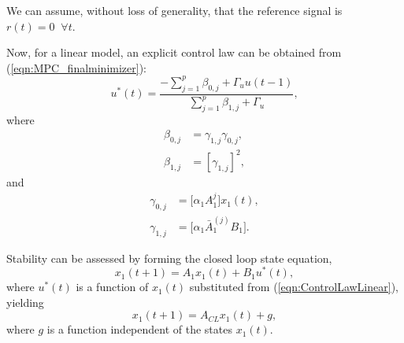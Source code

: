 \begin{proof*}
We can assume, without loss of generality, that the reference signal is $r(t) = 0 \; \; \forall t$. 

Now, for a linear model, an explicit control law can be obtained from (\ref{eqn:MPC_finalminimizer}):
\begin{equation}
u^*(t) = \frac{-\sum_{j=1}^p \beta_{0,j} + \Gamma_u u(t-1)}{\sum_{j=1}^p \beta_{1,j} + \Gamma_u},
\label{eqn:ControlLawLinear}
\end{equation}
where
\begin{align*}
\beta_{0,j} &= \gamma_{1,j} \gamma_{0,j}, \\
\beta_{1,j} &= [\gamma_{1,j}]^2, 
\end{align*}
and 
\begin{align*}
\gamma_{0,j} &= \bigg[ \alpha_1 A_1^j \bigg] x_1(t), \\
\gamma_{1,j} &= \bigg[ \alpha_1 \bar{A}_1^{(j)} B_1 \bigg].
\end{align*}

Stability can be assessed by forming the closed loop state equation,
\begin{equation}
x_1(t+1) = A_1 x_1(t) + B_1 u^*(t),
\end{equation}
where $u^*(t)$ is a function of $x_1(t)$ substituted from (\ref{eqn:ControlLawLinear}), yielding
\begin{equation}
x_1(t+1) = A_{CL} x_1(t) + g,
\end{equation}
where $g$ is a function independent of the states $x_1(t)$. 


\end{proof*}
